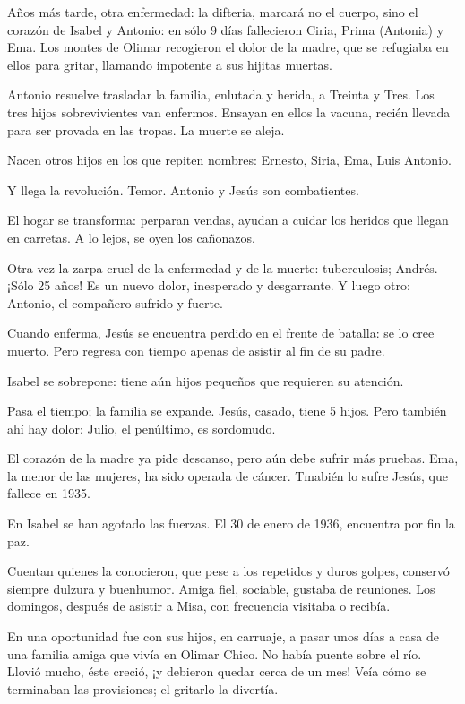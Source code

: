 \documentclass{article}
\begin{document}
Años más tarde, otra enfermedad: la difteria, marcará no el cuerpo, sino el corazón de Isabel y Antonio: en sólo 9 días fallecieron Ciria, Prima (Antonia) y Ema. Los montes de Olimar recogieron el dolor de la madre, que se refugiaba en ellos para gritar, llamando impotente a sus hijitas muertas.

Antonio resuelve trasladar la familia, enlutada y herida, a Treinta y Tres. Los tres hijos sobrevivientes van enfermos. Ensayan en ellos la vacuna, recién llevada para ser provada en las tropas. La muerte se aleja.

Nacen otros hijos en los que repiten nombres: Ernesto, Siria, Ema, Luis Antonio.

Y llega la revolución. Temor. Antonio y Jesús son combatientes.

El hogar se transforma: perparan vendas, ayudan a cuidar los heridos que llegan en carretas. A lo lejos, se oyen los cañonazos.

Otra vez la zarpa cruel de la enfermedad y de la muerte: tuberculosis; Andrés. ¡Sólo 25 años! Es un nuevo dolor, inesperado y desgarrante. Y luego otro: Antonio, el compañero sufrido y fuerte.

Cuando enferma, Jesús se encuentra perdido en el frente de batalla: se lo cree muerto. Pero regresa con tiempo apenas de asistir al fin de su padre.

Isabel se sobrepone: tiene aún hijos pequeños que requieren su atención.

Pasa el tiempo; la familia se expande. Jesús, casado, tiene 5 hijos. Pero también ahí hay dolor: Julio, el penúltimo, es sordomudo.

El corazón de la madre ya pide descanso, pero aún debe sufrir más pruebas. Ema, la menor de las mujeres, ha sido operada de cáncer. Tmabién lo sufre Jesús, que fallece en 1935.

En Isabel se han agotado las fuerzas. El 30 de enero de 1936, encuentra por fin la paz.

Cuentan quienes la conocieron, que pese a los repetidos y duros golpes, conservó siempre dulzura y buenhumor. Amiga fiel, sociable, gustaba de reuniones. Los domingos, después de asistir a Misa, con frecuencia visitaba o recibía.

En una oportunidad fue con sus hijos, en carruaje, a pasar unos días a casa de una familia amiga que vivía en Olimar Chico. No había puente sobre el río. Llovió mucho, éste creció, ¡y debieron quedar cerca de un mes! Veía cómo se terminaban las provisiones; el gritarlo la divertía.
\end{document}
